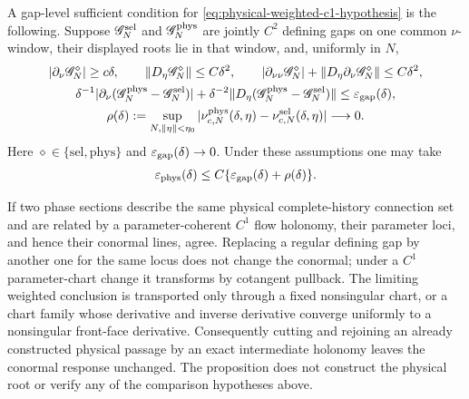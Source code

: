 \begin{proposition}
A gap-level sufficient condition for
\cref{eq:physical-weighted-c1-hypothesis} is the following.  Suppose
\(\mathscr G_N^{\rm sel}\) and \(\mathscr G_N^{\rm phys}\) are jointly
\(C^2\) defining gaps on one common \(\nu\)-window, their displayed roots lie
in that window, and, uniformly in \(N\),
\begin{gather}
 |\partial_\nu\mathscr G_N^\diamond|\ge c\delta,
 \qquad
 \|D_\eta\mathscr G_N^\diamond\|\le C\delta^2,
 \qquad
 |\partial_{\nu\nu}\mathscr G_N^\diamond|
  +\|D_\eta\partial_\nu\mathscr G_N^\diamond\|
     \le C\delta^2,                                   \label{eq:physical-gap-common-bounds}\\
 \delta^{-1}|\partial_\nu
       (\mathscr G_N^{\rm phys}-\mathscr G_N^{\rm sel})|
 +\delta^{-2}\|D_\eta
       (\mathscr G_N^{\rm phys}-\mathscr G_N^{\rm sel})\|
 \le \varepsilon_{\rm gap}(\delta),                  \label{eq:physical-gap-c1-comparison}\\
 \rho(\delta):=
 \sup_{N,\|\eta\|<\eta_0}
 |\nu^{\rm phys}_{c,N}(\delta,\eta)
       -\nu^{\rm sel}_{c,N}(\delta,\eta)|
 \longrightarrow0.                                   \label{eq:physical-root-c0-comparison}
\end{gather}
Here \(\diamond\in\{\mathrm{sel},\mathrm{phys}\}\) and
\(\varepsilon_{\rm gap}(\delta)\to0\).  Under these assumptions one may take
\begin{equation}
 \varepsilon_{\rm phys}(\delta)
 \le C\{\varepsilon_{\rm gap}(\delta)+\rho(\delta)\}. \label{eq:physical-transfer-modulus}
\end{equation}

If two phase sections describe the same physical complete-history connection
set and are related by a parameter-coherent \(C^1\) flow holonomy, their
parameter loci, and hence their conormal lines, agree.  Replacing a regular
defining gap by another one for the same locus does not change the conormal;
under a \(C^1\) parameter-chart change it transforms by cotangent pullback.
The limiting weighted conclusion is transported only through a fixed
nonsingular chart, or a chart family whose derivative and inverse derivative
converge uniformly to a nonsingular front-face derivative.
Consequently cutting and rejoining an already constructed physical passage
by an exact intermediate holonomy leaves the conormal response unchanged.
The proposition does not construct the physical root or verify any of the
comparison hypotheses above.
\end{proposition}

